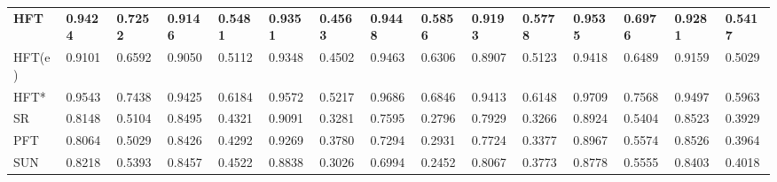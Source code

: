 \documentclass[10pt,journal,cspaper,compsoc]{IEEEtran}
\begin{document}
\begin{table*}[htbp]
\begin{tabular}{@{}lp{.78cm}p{.78cm}p{.78cm}p{.78cm}p{.78cm}p{.78cm}p{.78cm}p{.78cm}p{.78cm}p{.78cm}p{.78cm}p{.78cm}p{.78cm}p{.78cm}@{}}
{\bf HFT} &{\bf0.9424} &{\bf0.7252}        &{\bf0.9146} &{\bf0.5481}        &{\bf0.9351} &{\bf0.4563}        &{\bf0.9448} &{\bf0.5856}        &{\bf0.9193} &{\bf0.5778}        &{\bf0.9535} &{\bf0.6976}  &{\bf 0.9281} &{\bf 0.5417}\\
HFT(e)&0.9101 &0.6592        &0.9050 &0.5112        &0.9348 &0.4502        &0.9463 &0.6306        &0.8907 &0.5123        &0.9418 &0.6489  &0.9159 &0.5029\\
HFT* &0.9543 &0.7438        &0.9425 &0.6184        &0.9572 &0.5217        &0.9686 &0.6846        &0.9413 &0.6148        &0.9709 &0.7568  &0.9497  &0.5963\\
SR	 &0.8148 &0.5104         &0.8495 &0.4321         &0.9091 &0.3281         &0.7595 &0.2796         &0.7929 &0.3266         &0.8924 &0.5404  &0.8523 &0.3929\\ 	
PFT	 &0.8064 & 0.5029 & 0.8426 & 0.4292 & 0.9269 & 0.3780 & 0.7294 & 0.2931 & 0.7724 & 0.3377 & 0.8967 & 0.5574 &0.8526 &0.3964\\ 	
SUN	 &0.8218 &0.5393       &0.8457 &0.4522        &0.8838 &0.3026        &0.6994 &0.2452        &0.8067 &0.3773        &0.8778 &0.5555 &0.8403  &0.4018\\
\bottomrule 	
\end{tabular} 	
\end{table*} 	
\end{document}
